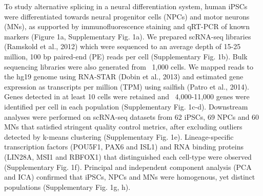 To study alternative splicing in a neural differentiation system, human iPSCs were differentiated towards neural progenitor cells (NPCs) and motor neurons (MNs), as supported by immunofluorescence staining and qRT-PCR of known markers (Figure 1a, Supplementary Fig. 1a). We prepared scRNA-seq libraries (Ramskold et al., 2012) which were sequenced to an average depth of 15-25 million, 100 bp paired-end (PE) reads per cell (Supplementary Fig. 1b). Bulk sequencing libraries were also generated from ~1,000 cells. We mapped reads to the hg19 genome using RNA-STAR (Dobin et al., 2013) and estimated gene expression as transcripts per million (TPM) using sailfish (Patro et al., 2014). Genes detected in at least 10 cells were retained and ~4,000-11,000 genes were identified per cell in each population (Supplementary Fig. 1c-d). Downstream analyses were performed on scRNA-seq datasets from 62 iPSCs, 69 NPCs and 60 MNs that satisfied stringent quality control metrics, after excluding outliers detected by k-means clustering (Supplementary Fig. 1e). Lineage-specific transcription factors (POU5F1, PAX6 and ISL1) and RNA binding proteins (LIN28A, MSI1 and RBFOX1) that distinguished each cell-type were observed (Supplementary Fig. 1f). Principal and independent component analysis (PCA and ICA) confirmed that iPSCs, NPCs and MNs were homogenous, yet distinct populations (Supplementary Fig. 1g, h). 

